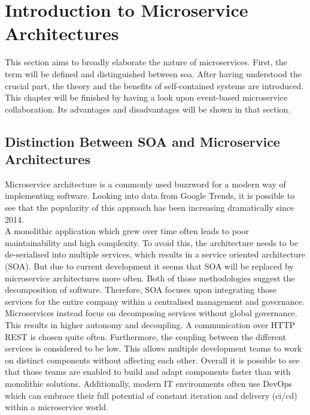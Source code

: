 \section{Introduction to Microservice  Architectures}
\label{sec:techKnowHow}
This section aims to broadly elaborate the nature of microservices. First, the term will be defined and distinguished between \acrfull{soa}. After having understood the crucial part, the theory and the benefits of self-contained systems are introduced. This chapter will be finished by having a look upon event-based microservice  collaboration. Its advantages and disadvantages will be shown in that section. 

\subsection{Distinction Between SOA and Microservice Architectures}
Microservice architecture is a commonly used buzzword for a modern way of implementing software. Looking into data from Google Trends, it is possible to see that the popularity of this approach has been increasing dramatically since 2014. \cite{microservices}\newline
\\
A monolithic application which grew over time often leads to poor maintainability and high complexity. To avoid this, the architecture needs to be de-serialised into multiple services, which results in a service oriented architecture (SOA). But due to current development it seems that SOA will be replaced by microservice architectures more often.\cite{mircorVSsoa}\newline
Both of those methodologies suggest the decomposition of software. Therefore, SOA focuses upon integrating those services for the entire company within a centralised management and governance. Microservices instead focus on decomposing services without global governance. This results in higher autonomy and decoupling. \cite{mircorVSsoa} A communication over HTTP REST is chosen quite often.\newline
Furthermore, the coupling between the different services is considered to be low. This allows multiple development teams to work on distinct components without affecting each other. Overall it is possible to see that those teams are enabled to build and adapt components faster than with monolithic solutions. Additionally,  modern IT environments often use DevOps which can embrace their full potential of constant iteration and delivery (\acrshort{ci/cd}) within a microservice  world. \cite{redHatMicroservices}\newline
